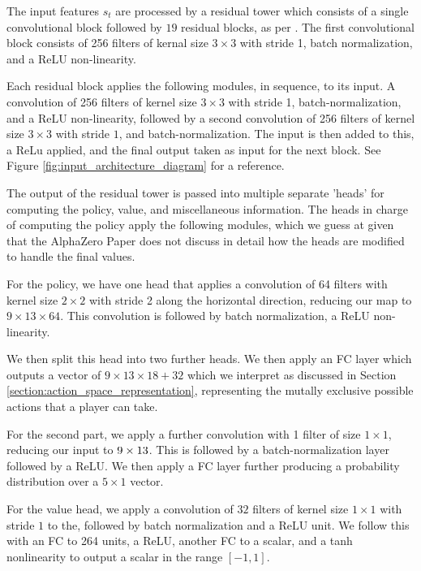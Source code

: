 \documentclass[8pt,twocolumn]{article}
\begin{document}
The input features $s_t$ are processed by a residual tower which consists of a single convolutional block  followed by $19$ residual blocks, as per \cite{AlphaGoZero}. The first convolutional block consists of 256 filters of kernal size $3 \times 3$ with stride 1, batch normalization, and a ReLU non-linearity. 

Each residual block applies the following modules, in sequence, to its input. A convolution of 256 filters of kernel size $3 \times 3$ with stride 1, batch-normalization, and a ReLU non-linearity, followed by a second convolution of 256 filters of kernel size $3 \times 3$ with stride $1$, and batch-normalization. The input is then added to this, a ReLu applied, and the final output taken as input for the next block. See Figure \ref{fig:input_architecture_diagram} for a reference.

The output of the residual tower is passed into multiple separate 'heads' for computing the policy, value, and miscellaneous information. The heads in charge of computing the policy apply the following modules, which we guess at given that the AlphaZero Paper \cite{AlphaZero} does not discuss in detail how the heads are modified to handle the final values.

For the policy, we have one head that applies a convolution of 64 filters with kernel size $2 \times 2$ with stride 2 along the horizontal direction, reducing our map to $9 \times 13 \times 64$. This convolution is followed by batch normalization, a ReLU non-linearity.

We then split this head into two further heads. We then apply an FC layer which outputs a vector of $9 \times 13 \times 18 + 32$ which we interpret as discussed in Section \ref{section:action_space_representation}, representing the mutally exclusive possible actions that a player can take.

For the second part, we apply a further convolution with 1 filter of size $1 \times 1$, reducing our input to $9 \times 13 \time 1$. This is followed by a batch-normalization layer followed by a ReLU. We then apply a FC layer further producing a probability distribution over a $5 \times 1$ vector.


For the value head, we apply a convolution of $32$ filters of kernel size $1 \times 1$ with stride $1$ to the, followed by batch normalization and a ReLU unit. We follow this with an FC to 264 units, a ReLU, another FC to a scalar, and a tanh nonlinearity to output a scalar in the range $[-1, 1]$.
\end{document}
